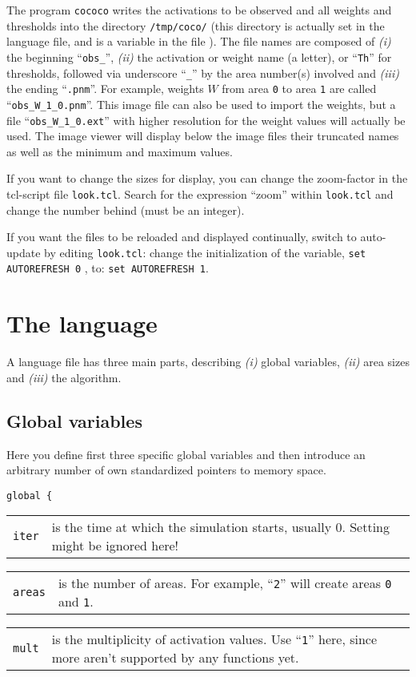 \documentclass[12pt]{article}
\begin{document}
The program \texttt{cococo} writes the activations to be observed and all weights and thresholds into the directory \texttt{/tmp/coco/} (this directory is actually set in the language file, and is a variable in the file ).
The file names are composed of
{\sl (i)} the beginning ``\texttt{obs\_}'',
{\sl (ii)} the activation or weight name (a letter), or ``\texttt{Th}'' for thresholds,
           followed via underscore ``\texttt{\_}'' by the area number(s) involved and
{\sl (iii)} the ending ``\texttt{.pnm}''.
For example, weights $W$ from area \texttt{0} to area \texttt{1} are called ``\texttt{obs\_W\_1\_0.pnm}''.
This image file can also be used to import the weights, but a file ``\texttt{obs\_W\_1\_0.ext}'' with higher resolution for the weight values will actually be used.
The image viewer will display below the image files their truncated names as well as the minimum and maximum values.

If you want to change the sizes for display, you can change the zoom-factor in the tcl-script file \texttt{look.tcl}.
Search for the expression ``zoom'' within \texttt{look.tcl} and change the number behind (must be an integer).

If you want the files to be reloaded and displayed continually, switch to auto-update by editing \texttt{look.tcl}:
change the initialization of the variable, \texttt{set AUTOREFRESH 0} , to: \texttt{set AUTOREFRESH 1}.


\section{The language}

A language file has three main parts, describing {\sl (i)} global variables, {\sl (ii)} area sizes and {\sl (iii)} the algorithm.

\subsection{Global variables}

Here you define first three specific global variables
and then introduce an arbitrary number of own standardized pointers to memory space.

\texttt{global \{} \\
\begin{tabular}{p{2.25cm}p{12.75cm}}
\texttt{iter} &
  is the time at which the simulation starts, usually 0.
  {\color{red} Setting might be ignored here!} \\
\end{tabular}
\begin{tabular}{p{2.25cm}p{12.75cm}}
\texttt{areas} &
  is the number of areas. For example, ``\texttt{2}'' will create areas \texttt{0} and \texttt{1}.\\
\end{tabular}
\begin{tabular}{p{2.25cm}p{12.75cm}}
\texttt{mult} &
  is the multiplicity of activation values. Use ``\texttt{1}'' here, since more aren't supported by any functions yet.\\
\end{tabular}
\end{document}
